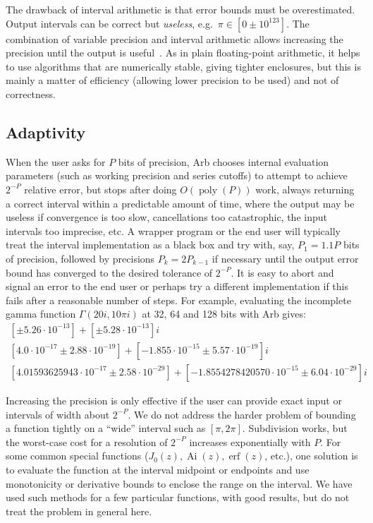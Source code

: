 \documentclass[11pt,a4paper]{article}
\begin{document}
The drawback of interval arithmetic
is that error bounds must be overestimated.
Output intervals can be correct but
\emph{useless}, e.g.\ $\pi \in [0 \pm 10^{123}]$.
The combination of variable precision and interval arithmetic
allows increasing the precision until the output is useful~\cite{RevolRouillier2005}.
As in plain floating-point arithmetic, it helps to use algorithms
that are numerically stable, giving tighter enclosures,
but this is mainly a matter of efficiency (allowing lower precision to be used) and not of correctness.

\subsection{Adaptivity}

When the user asks for $P$ bits of precision,
Arb chooses internal evaluation parameters
(such as working precision and series cutoffs) to attempt to achieve $2^{-P}$
relative error, but stops
after doing $O(\operatorname{poly}(P))$ work, always returning a correct
interval within a predictable amount of time, where the output
may be useless if convergence is too slow,
cancellations too catastrophic, the input intervals too imprecise, etc.
A wrapper program or the end user will typically treat the
interval implementation as a black box and try
with, say, $P_1 = 1.1 P$ bits of precision, followed by precisions
$P_k = 2P_{k-1}$ if necessary until the output error bound has converged to
the desired tolerance of $2^{-P}$.
It is easy to abort and signal an error to the end user or
perhaps try a different implementation if
this fails after a reasonable number of steps.
For example, evaluating the incomplete gamma
function $\Gamma(20i, 10\pi i)$ at 32, 64 and 128 bits with Arb gives:
\begin{equation*}
\begin{array}{c}
{}[\pm 5.26 \cdot 10^{-13}] + [\pm 5.28 \cdot 10^{-13}]i \\
{}[4.0 \cdot 10^{-17} \pm 2.88 \cdot 10^{-19}] + [-1.855 \cdot 10^{-15} \pm 5.57 \cdot 10^{-19}]i \\
{}[4.01593625943 \cdot 10^{-17} \pm 2.58 \cdot 10^{-29}] + [-1.8554278420570 \cdot 10^{-15} \pm 6.04 \cdot 10^{-29}]i
\end{array}
\end{equation*}

Increasing the precision is only effective if the user can
provide exact input or intervals of width about $2^{-P}$.
We do not address the harder problem of bounding a function tightly
on a ``wide'' interval such as $[\pi,2\pi]$. Subdivision works,
but the worst-case cost for a resolution of $2^{-P}$ increases exponentially with $P$.
For some common special functions
($J_0(z), \operatorname{Ai}(z), \operatorname{erf}(z)$, etc.),
one solution is to evaluate the
function at the interval midpoint or endpoints and use
monotonicity or derivative bounds to enclose
the range on the interval.
We have used such methods for a few particular functions,
with good results, but do not treat the problem in general here.
\end{document}
